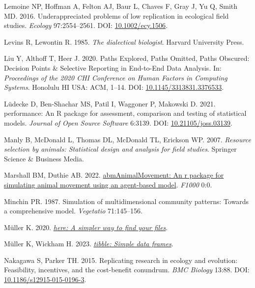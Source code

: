 \documentclass[10pt,a4paper]{article}
\newlength{\cslhangindent}
\newlength{\cslentryspacingunit} %
\newenvironment{CSLReferences}[2] %
 {%
  \setlength{\parindent}{0pt}
  \ifodd #1
  \let\oldpar\par
  \def\par{\hangindent=\cslhangindent\oldpar}
  \fi
  \setlength{\parskip}{#2\cslentryspacingunit}
 }%
 {}
\begin{document}
\begin{CSLReferences}{1}{0}
Lemoine NP, Hoffman A, Felton AJ, Baur L, Chaves F, Gray J, Yu Q, Smith MD. 2016. Underappreciated problems of low replication in ecological field studies. \emph{Ecology} 97:2554--2561. DOI: \href{https://doi.org/10.1002/ecy.1506}{10.1002/ecy.1506}.

Levins R, Lewontin R. 1985. \emph{The dialectical biologist}. Harvard University Press.

Liu Y, Althoff T, Heer J. 2020. Paths {Explored}, {Paths} {Omitted}, {Paths} {Obscured}: {Decision} {Points} \& {Selective} {Reporting} in {End}-to-{End} {Data} {Analysis}. In: \emph{Proceedings of the 2020 {CHI} {Conference} on {Human} {Factors} in {Computing} {Systems}}. Honolulu HI USA: ACM, 1--14. DOI: \href{https://doi.org/10.1145/3313831.3376533}{10.1145/3313831.3376533}.

Lüdecke D, Ben-Shachar MS, Patil I, Waggoner P, Makowski D. 2021. {performance}: An {R} package for assessment, comparison and testing of statistical models. \emph{Journal of Open Source Software} 6:3139. DOI: \href{https://doi.org/10.21105/joss.03139}{10.21105/joss.03139}.

Manly B, McDonald L, Thomas DL, McDonald TL, Erickson WP. 2007. \emph{Resource selection by animals: Statistical design and analysis for field studies}. Springer Science \& Business Media.

Marshall BM, Duthie AB. 2022. \href{https://0}{{abmAnimalMovement}: An r package for simulating animal movement using an agent-based model}. \emph{F1000} 0:0.

Minchin PR. 1987. Simulation of multidimensional community patterns: Towards a comprehensive model. \emph{Vegetatio} 71:145--156.

Müller K. 2020. \emph{\href{https://CRAN.R-project.org/package=here}{{here}: A simpler way to find your files}}.

Müller K, Wickham H. 2023. \emph{\href{https://CRAN.R-project.org/package=tibble}{{tibble}: Simple data frames}}.

Nakagawa S, Parker TH. 2015. Replicating research in ecology and evolution: Feasibility, incentives, and the cost-benefit conundrum. \emph{BMC Biology} 13:88. DOI: \href{https://doi.org/10.1186/s12915-015-0196-3}{10.1186/s12915-015-0196-3}.


\end{CSLReferences}
\end{document}
